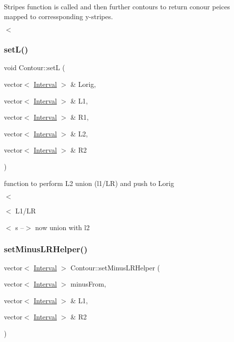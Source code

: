 Stripes function is called and then further contours to return conour peices mapped to corressponding y-\/stripes. 

$<$ \mbox{\label{classContour_a89c3cb99cdd161bef97100bfdac69211}} 
\subsubsection{\texorpdfstring{set\+L()}{setL()}}
{\footnotesize\ttfamily void Contour\+::setL (\begin{DoxyParamCaption}\item[{vector$<$ \hyperlink{classInterval}{Interval} $>$ \&}]{Lorig,  }\item[{vector$<$ \hyperlink{classInterval}{Interval} $>$ \&}]{L1,  }\item[{vector$<$ \hyperlink{classInterval}{Interval} $>$ \&}]{R1,  }\item[{vector$<$ \hyperlink{classInterval}{Interval} $>$ \&}]{L2,  }\item[{vector$<$ \hyperlink{classInterval}{Interval} $>$ \&}]{R2 }\end{DoxyParamCaption})}



function to perform L2 union (l1/\+LR) and push to Lorig 

$<$

$<$ L1/\+LR

$<$ s --$>$ now union with l2 \mbox{\label{classContour_adde8de028db63f76082daea730ca87ed}} 
\subsubsection{\texorpdfstring{set\+Minus\+L\+R\+Helper()}{setMinusLRHelper()}}
{\footnotesize\ttfamily vector$<$ \hyperlink{classInterval}{Interval} $>$ Contour\+::set\+Minus\+L\+R\+Helper (\begin{DoxyParamCaption}\item[{vector$<$ \hyperlink{classInterval}{Interval} $>$}]{minus\+From,  }\item[{vector$<$ \hyperlink{classInterval}{Interval} $>$ \&}]{L1,  }\item[{vector$<$ \hyperlink{classInterval}{Interval} $>$ \&}]{R2 }\end{DoxyParamCaption})}



